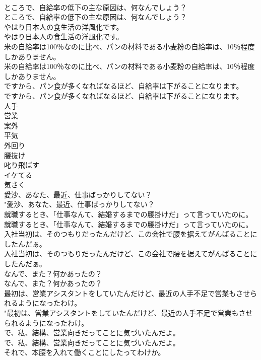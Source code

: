 \documentclass[8pt]{extreport}
\begin{document}
\begin{CJK}{UTF8}{min}
\\	ところで、自給率の低下の主な原因は、何なんでしょう？	
\\	ところで、自給率の低下の主な原因は、何なんでしょう？ 
\\	やはり日本人の食生活の洋風化です。	
\\	やはり日本人の食生活の洋風化です。 
\\	米の自給率は100％なのに比べ、パンの材料である小麦粉の自給率は、10％程度しかありません。	
\\	米の自給率は100％なのに比べ、パンの材料である小麦粉の自給率は、10％程度しかありません。 
\\	ですから、パン食が多くなればなるほど、自給率は下がることになります。	
\\	ですから、パン食が多くなればなるほど、自給率は下がることになります。 
\\	人手
\\	営業
\\	案外
\\	平気
\\	外回り
\\	腰抜け
\\	叱り飛ばす
\\	イケてる
\\	気さく
\\	愛沙、あなた、最近、仕事ばっかりしてない？	
\\	"愛沙、あなた、最近、仕事ばっかりしてない？ 
\\	就職するとき、「仕事なんて、結婚するまでの腰掛けだ」って言っていたのに。	
\\	就職するとき、「仕事なんて、結婚するまでの腰掛けだ」って言っていたのに。 
\\	入社当初は、そのつもりだったんだけど、この会社で腰を据えてがんばることにしたんだぁ。	
\\	入社当初は、そのつもりだったんだけど、この会社で腰を据えてがんばることにしたんだぁ。 
\\	なんで、また？何かあったの？	
\\	なんで、また？何かあったの？ 
\\	最初は、営業アシスタントをしていたんだけど、最近の人手不足で営業もさせられるようになったわけ。	
\\	"最初は、営業アシスタントをしていたんだけど、最近の人手不足で営業もさせられるようになったわけ。 
\\	で、私、結構、営業向きだってことに気づいたんだよ。	
\\	で、私、結構、営業向きだってことに気づいたんだよ。 
\\	それで、本腰を入れて働くことにしたってわけか。	

\end{CJK}
\end{document}
